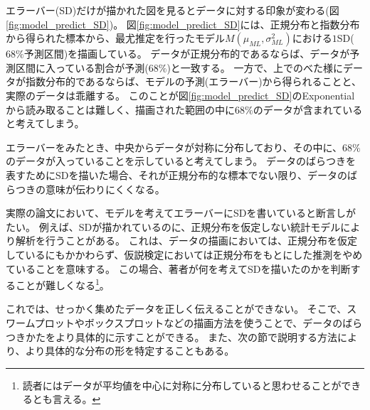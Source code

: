 エラーバー(SD)だけが描かれた図を見るとデータに対する印象が変わる(図\ref{fig:model_predict_SD})。
図\ref{fig:model_predict_SD}には、正規分布と指数分布から得られた標本から、最尤推定を行ったモデル$M(\mu_{ML},\sigma^2_{ML})$における$1$SD($68\%$予測区間)を描画している。
データが正規分布的であるならば、データが予測区間に入っている割合が予測($68\%$)と一致する。
一方で、上でのべた様にデータが指数分布的であるならば、モデルの予測(エラーバー)から得られることと、実際のデータは乖離する。
このことが図\ref{fig:model_predict_SD}のExponentialから読み取ることは難しく、描画された範囲の中に$68\%$のデータが含まれていると考えてしまう。

エラーバーをみたとき、中央からデータが対称に分布しており、その中に、$68\%$のデータが入っていることを示していると考えてしまう。
データのばらつきを表すためにSDを描いた場合、それが正規分布的な標本でない限り、データのばらつきの意味が伝わりにくくなる。

実際の論文において、モデルを考えてエラーバーにSDを書いていると断言しがたい。
例えば、SDが描かれているのに、正規分布を仮定しない統計モデルにより解析を行うことがある。
これは、データの描画においては、正規分布を仮定しているにもかかわらず、仮説検定においては正規分布をもとにした推測をやめていることを意味する。
この場合、著者が何を考えてSDを描いたのかを判断することが難しくなる\footnote{読者にはデータが平均値を中心に対称に分布していると思わせることができるとも言える。}。


これでは、せっかく集めたデータを正しく伝えることができない。
そこで、スワームプロットやボックスプロットなどの描画方法を使うことで、データのばらつきかたをより具体的に示すことができる。
また、次の節で説明する方法により、より具体的な分布の形を特定することもある。



